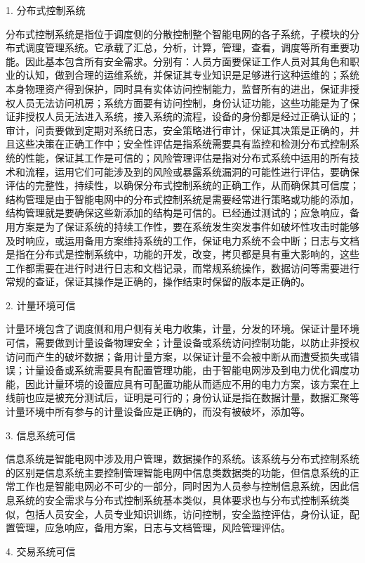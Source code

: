 \documentclass[10.5pt,twocolumn]{jbuaa}
\begin{document}
1. 分布式控制系统

分布式控制系统是指位于调度侧的分散控制整个智能电网的各子系统，子模块的分布式调度管理系统。它承载了汇总，分析，计算，管理，查看，调度等所有重要功能。因此基本包含所有安全需求。分别有：人员方面要保证工作人员对其角色和职业的认知，做到合理的运维系统，并保证其专业知识是足够进行这种运维的；系统本身物理资产得到保护，同时具有实体访问控制能力，监督所有的进出，保证非授权人员无法访问机房；系统方面要有访问控制，身份认证功能，这些功能是为了保证非授权人员无法进入系统，接入系统的流程，设备的身份都是经过正确认证的；审计，问责要做到定期对系统日志，安全策略进行审计，保证其决策是正确的，并且这些决策在正确工作中；安全性评估是指系统需要具有监控和检测分布式控制系统的性能，保证其工作是可信的；风险管理评估是指对分布式系统中运用的所有技术和流程，运用它们可能涉及到的风险或暴露系统漏洞的可能性进行评估，要确保评估的完整性，持续性，以确保分布式控制系统的正确工作，从而确保其可信度；结构管理是由于智能电网中的分布式控制系统是需要经常进行策略或功能的添加，结构管理就是要确保这些新添加的结构是可信的。已经通过测试的；应急响应，备用方案是为了保证系统的持续工作性，要在系统发生突发事件如破坏性攻击时能够及时响应，或运用备用方案维持系统的工作，保证电力系统不会中断；日志与文档是指在分布式是控制系统中，功能的开发，改变，拷贝都是具有重大影响的，这些工作都需要在进行时进行日志和文档记录，而常规系统操作，数据访问等需要进行常规的查证，保证其操作是正确的，操作结束时保留的版本是正确的。

2. 计量环境可信

计量环境包含了调度侧和用户侧有关电力收集，计量，分发的环境。保证计量环境可信，需要做到计量设备物理安全；计量设备或系统访问控制功能，以防止非授权访问而产生的破坏数据；备用计量方案，以保证计量不会被中断从而遭受损失或错误；计量设备或系统需要具有配置管理功能，由于智能电网涉及到电力优化调度功能，因此计量环境的设置应具有可配置功能从而适应不用的电力方案，该方案在上线前也应是被充分测试后，证明是可行的；身份认证是指在数据计量，数据汇聚等计量环境中所有参与的计量设备应是正确的，而没有被破坏，添加等。

3. 信息系统可信

信息系统是智能电网中涉及用户管理，数据操作的系统。该系统与分布式控制系统的区别是信息系统主要控制管理智能电网中信息类数据类的功能，但信息系统的正常工作也是智能电网必不可少的一部分，同时因为人员参与控制信息系统，因此信息系统的安全需求与分布式控制系统基本类似，具体要求也与分布式控制系统类似，包括人员安全，人员专业知识训练，访问控制，安全监控评估，身份认证，配置管理，应急响应，备用方案，日志与文档管理，风险管理评估。

4. 交易系统可信
\end{document}
